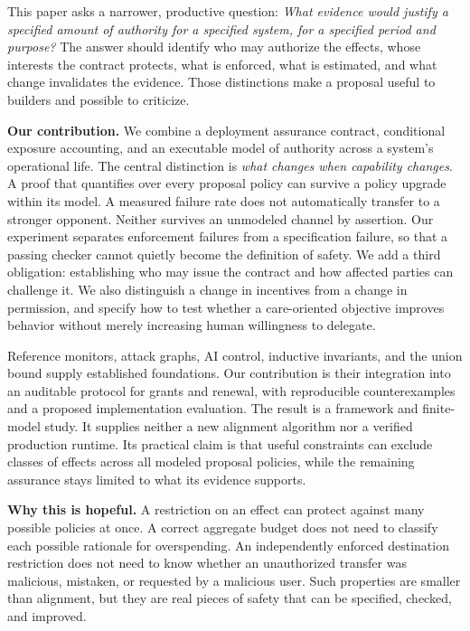 \documentclass[10pt,twocolumn,letterpaper]{article}
\newcommand{\para}[1]{\smallskip\noindent\textbf{#1}\enspace}
\begin{document}
This paper asks a narrower, productive question: \emph{What evidence would justify a specified amount of authority for a specified system, for a specified period and purpose?} The answer should identify who may authorize the effects, whose interests the contract protects, what is enforced, what is estimated, and what change invalidates the evidence. Those distinctions make a proposal useful to builders and possible to criticize.

\para{Our contribution.} We combine a deployment assurance contract, conditional exposure accounting, and an executable model of authority across a system's operational life. The central distinction is \emph{what changes when capability changes}. A proof that quantifies over every proposal policy can survive a policy upgrade within its model. A measured failure rate does not automatically transfer to a stronger opponent. Neither survives an unmodeled channel by assertion. Our experiment separates enforcement failures from a specification failure, so that a passing checker cannot quietly become the definition of safety. We add a third obligation: establishing who may issue the contract and how affected parties can challenge it. We also distinguish a change in incentives from a change in permission, and specify how to test whether a care-oriented objective improves behavior without merely increasing human willingness to delegate.

Reference monitors, attack graphs, AI control, inductive invariants, and the union bound supply established foundations. Our contribution is their integration into an auditable protocol for grants and renewal, with reproducible counterexamples and a proposed implementation evaluation. The result is a framework and finite-model study. It supplies neither a new alignment algorithm nor a verified production runtime. Its practical claim is that useful constraints can exclude classes of effects across all modeled proposal policies, while the remaining assurance stays limited to what its evidence supports.

\para{Why this is hopeful.} A restriction on an effect can protect against many possible policies at once. A correct aggregate budget does not need to classify each possible rationale for overspending. An independently enforced destination restriction does not need to know whether an unauthorized transfer was malicious, mistaken, or requested by a malicious user. Such properties are smaller than alignment, but they are real pieces of safety that can be specified, checked, and improved.
\end{document}
